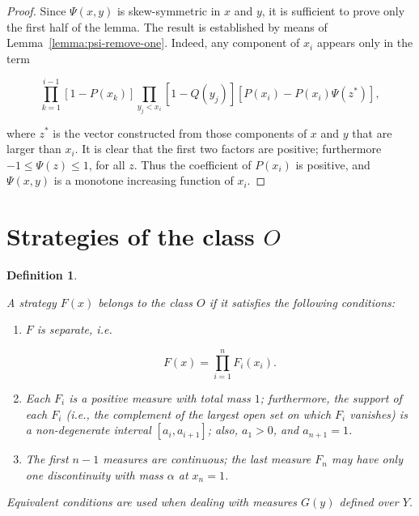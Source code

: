 \documentclass{article}
\newtheorem{definition}{Definition}
\begin{document}
\begin{proof}

Since $\Psi(x, y)$ is skew-symmetric in $x$ and $y$, it is sufficient to prove
only the first half of the lemma. The result is established by means of
Lemma~\ref{lemma:psi-remove-one}. Indeed, any component of $x_i$ appears only
in the term

\[
    \prod_{k=1}^{i-1} [1 - P(x_k)] \prod_{y_j < x_i} [1 - Q(y_j)] [P(x_i) -
P(x_i) \Psi(z^*)],
\]

where $z^*$ is the vector constructed from those components of $x$ and $y$ that
are larger than $x_i$. It is clear that the first two factors are positive;
furthermore $-1 \leq \Psi(z) \leq 1$, for all $z$. Thus the coefficient of
$P(x_i)$ is positive, and $\Psi(x, y)$ is a monotone increasing function of
$x_i$.

\end{proof}

\section{Strategies of the class $O$}

\begin{definition} \label{defn:class-o}

A strategy $F(x)$ belongs to the class $O$ if it satisfies the following
conditions:

\begin{enumerate}

\item $F$ is separate, i.e.

\[
    F(x) = \prod_{i=1}^n F_i(x_i).
\]

\item Each $F_i$ is a positive measure with total mass $1$; furthermore, the
support of each $F_i$ (i.e., the complement of the largest open set on which
$F_i$ vanishes) is a non-degenerate interval $[a_i, a_{i+1}]$; also, $a_1 > 0$,
and $a_{n+1} = 1$.

\item The first $n-1$ measures are continuous; the last measure $F_n$ may have
only one discontinuity with mass $\alpha$ at $x_n = 1$.

\end{enumerate}

Equivalent conditions are used when dealing with measures $G(y)$ defined over
$Y$.

\end{definition}
\end{document}
